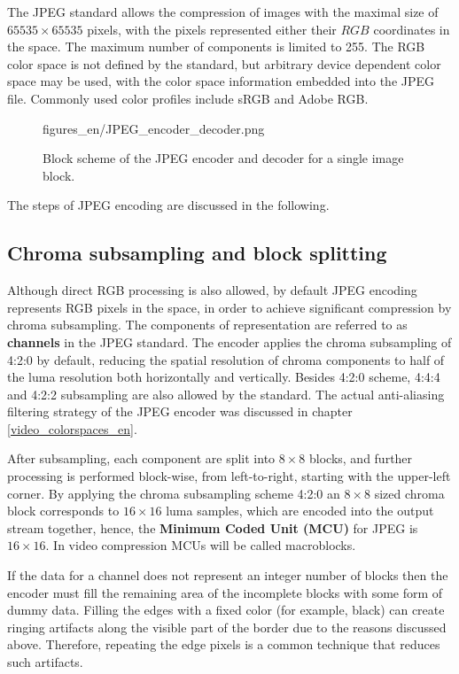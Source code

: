 \vspace{3mm}
The JPEG standard allows the compression of images with the maximal size of $65535 \times 65535$ pixels, with the pixels represented either their $RGB$ coordinates in the \ycbcr space.
The maximum number of components is limited to 255.
The RGB color space is not defined by the standard, but arbitrary device dependent color space may be used, with the color space information embedded into the JPEG file.
Commonly used color profiles include sRGB and Adobe RGB. 

\begin{figure}[h!]
	\centering
	\begin{overpic}[width = 1\columnwidth ]{figures_en/JPEG_encoder_decoder.png}
	\end{overpic}
	\caption{Block scheme of the JPEG encoder and decoder for a single image block.}
	\label{Fig:JPEG_encoder_decoder}
\end{figure}

The steps of JPEG encoding are discussed in the following.

\subsection*{Chroma subsampling and block splitting}

Although direct RGB processing is also allowed, by default JPEG encoding represents RGB pixels in the \ycbcr space, in order to achieve significant compression by chroma subsampling.
The components of representation are referred to as \textbf{channels} in the JPEG standard.
The encoder applies the chroma subsampling of 4:2:0 by default, reducing the spatial resolution of chroma components to half of the luma resolution both horizontally and vertically.
Besides 4:2:0 scheme, 4:4:4 and 4:2:2 subsampling are also allowed by the standard.
The actual anti-aliasing filtering strategy of the JPEG encoder was discussed in chapter \ref{video_colorspaces_en}.

After subsampling, each component are split into $8\times 8$ blocks, and further processing is performed block-wise, from left-to-right, starting with the upper-left corner.
By applying the chroma subsampling scheme 4:2:0 an $8 \times 8$ sized chroma block corresponds to $16 \times 16$ luma samples, which are encoded into the output stream together, hence, the \textbf{Minimum Coded Unit (MCU)} for JPEG is $16 \times 16$.
In video compression MCUs will be called macroblocks. 

If the data for a channel does not represent an integer number of blocks then the encoder must fill the remaining area of the incomplete blocks with some form of dummy data. 
Filling the edges with a fixed color (for example, black) can create ringing artifacts along the visible part of the border due to the reasons discussed above.
Therefore, repeating the edge pixels is a common technique that reduces such artifacts.

